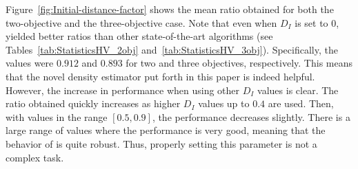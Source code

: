 Figure~\ref{fig:Initial-distance-factor} shows the mean \HV{} ratio obtained for both the two-objective 
and the three-objective case.
%
Note that even when $D_I$ is set to $0$, \VSDMOEA{} yielded better \HV{} ratios than other 
state-of-the-art algorithms (see Tables~\ref{tab:StatisticsHV_2obj} and~\ref{tab:StatisticsHV_3obj}).
%
Specifically, the values were $0.912$ and $0.893$ for two and three objectives, respectively.
%
This means that the novel density estimator put forth in this paper is indeed helpful.
%
However, the increase in performance when using other $D_I$ values is clear.
%
The \HV{} ratio obtained quickly increases as higher $D_I$ values up to $0.4$ are used.
%
Then, with values in the range $[0.5, 0.9]$, the performance decreases slightly.
%
There is a large range of values where the performance is very good, meaning that 
the behavior of \VSDMOEA{} is quite robust.
%
Thus, properly setting this parameter is not a complex task.
%


